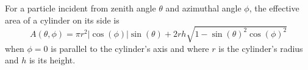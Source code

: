 \documentclass[herrin-thesis.tex]{subfiles}
\begin{document}
For a particle incident from zenith angle \(\theta\) and azimuthal angle \(\phi\), the effective area of a cylinder on its side is
\begin{equation}
A(\theta,\phi) = \pi r^2 |\cos(\phi)|\sin(\theta) + 2 r h \sqrt{1-\sin(\theta)^2 \cos(\phi)^2}
\end{equation}
when \(\phi=0\) is parallel to the cylinder's axis and where \(r\) is the cylinder's radius and \(h\) is its height.
\end{document}
